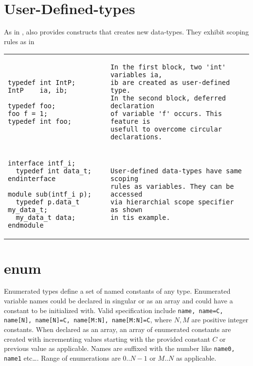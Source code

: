 \section{User-Defined-types}
As in \lc, \lvlog also provides \kwtypedef constructs that creates new
data-types. They exhibit scoping rules as in \lcpp 

\begin{table}
\begin{tabular}{p{} p{}}

\begin{Verbatim}
typedef int IntP;
IntP    ia, ib;

typedef foo;
foo f = 1;
typedef int foo;
\end{Verbatim}
&
\begin{tbldesc}
\begin{verbatim}
In the first block, two 'int' variables ia,
ib are created as user-defined type.
In the second block, deferred declaration
of variable 'f' occurs. This feature is
usefull to overcome circular declarations.
\end{verbatim}
\end{tbldesc}
\\
\begin{Verbatim}
interface intf_i;
  typedef int data_t;
endinterface

module sub(intf_i p);
  typedef p.data_t my_data_t;
  my_data_t data;
endmodule
\end{Verbatim}
&
\begin{tbldesc}
\begin{verbatim}
User-defined data-types have same scoping
rules as variables. They can be accessed
via hierarchial scope specifier as shown
in tis example.
\end{verbatim}
\end{tbldesc}

\end{tabular}
\end{table}


\section{enum}
Enumerated types define a set of named constants of any
type. Enumerated variable names could be declared in singular or as an
array and could have a constant to be initialized with. Valid
specification include
\verb|name, name=C, name[N], name[N]=C, name[M:N], name[M:N]=C|, where
$N, M$ are positive integer constants. When declared as an array, an
array of enumerated constants are created with incrementing values
starting with the provided constant $C$ or previous value as
applicable. Names are suffixed with the number like
\verb|name0, name1| etc\ldots. Range of enumerations are $0..N-1$ or
$M..N$ as applicable.

